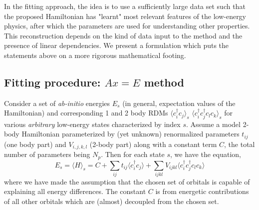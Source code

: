 \documentclass[prl,12pt,onecolumn,nofootinbib,notitlepage,english,superscriptaddress]{revtex4-1}
\begin{document}
In the fitting approach, the idea is to use a sufficiently 
large data set such that the proposed Hamiltonian has "learnt" most 
relevant features of the low-energy physics, after which the parameters 
are used for understanding other properties. 
This reconstruction depends on the kind of data input to the method 
and the presence of linear dependencies. 
We present a formulation which puts the statements above 
on a more rigorous mathematical footing.

\subsection{Fitting procedure: $Ax=E$ method}
\label{sec:AxE}
Consider a set of \emph{ab-initio} 
energies $E_s$ (in general, expectation values of the Hamiltonian) 
and corresponding 1 and 2 body RDMs $\langle c_i^{\dagger} c_j \rangle_s$ 
$\langle c_i^{\dagger}c_j^{\dagger} c_l c_k \rangle_s$ 
for various \emph{arbitrary} low-energy states characterized by index $s$. 
Assume a model 2-body Hamiltonian parameterized by (yet unknown) 
renormalized parameters $t_{ij}$ (one body part) 
and $V_{i,j,k,l}$ (2-body part) along with a constant term $C$, 
the total number of parameters being $N_p$. Then for each state $s$, 
we have the equation, 
\begin{equation}
	E_s = \langle H \rangle_s = C + \sum_{ij} t_{ij} \langle c_i^{\dagger} c_j \rangle + \sum_{ijkl} V_{ijkl} \langle c_i^{\dagger}c_j^{\dagger} c_l c_k \rangle  
\end{equation}
where we have made the assumption that the chosen set of orbitals 
is capable of explaining all energy differences. The constant $C$ is from energetic contributions 
of all other orbitals which are (almost) decoupled from the chosen set.  
 
\end{document}
